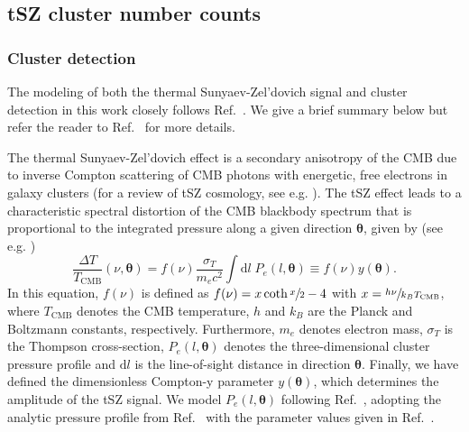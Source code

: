 \documentclass[%
 reprint,
nofootinbib,
 amsmath,amssymb,
 aps,
]{revtex4-1}
\begin{document}
\subsection{tSZ cluster number counts}

\subsubsection{Cluster detection}\label{subsubsec:obs.tSZ.detection}

The modeling of both the thermal Sunyaev-Zel'dovich signal and cluster detection in this work closely follows Ref.~\cite{Madhavacheril:2017}. We give a brief summary below but refer the reader to Ref.~\cite{Madhavacheril:2017} for more details.

The thermal Sunyaev-Zel'dovich effect is a secondary anisotropy of the CMB  due to inverse Compton scattering of CMB photons with energetic, free electrons in galaxy clusters (for a review of tSZ cosmology, see e.g. \cite{Carlstrom:2002}). The tSZ effect leads to a characteristic spectral distortion of the CMB blackbody spectrum that is proportional to the integrated pressure along a given direction $\boldsymbol{\theta}$, given by (see e.g. \cite{Carlstrom:2002, Planck:2016XXII})
\begin{equation}
\frac{\Delta T}{T_{\mathrm{CMB}}}(\nu, \boldsymbol{\theta}) = f(\nu) \frac{\sigma_{T}}{m_{e}c^{2}}\int \mathrm{d}l \; P_{e}(l, \boldsymbol{\theta}) \equiv f(\nu)y(\boldsymbol{\theta}).
\end{equation}
In this equation, $f(\nu)$ is defined as $f(\nu) = x \coth{\sfrac{x}{2}} - 4$ with $x=\sfrac{h \nu}{k_{B}T_{\mathrm{CMB}}}$, where $T_{\mathrm{CMB}}$ denotes the CMB temperature, $h$ and $k_{B}$ are the Planck and Boltzmann constants, respectively. Furthermore, $m_{e}$ denotes electron mass, $\sigma_{T}$ is the Thompson cross-section, $P_{e}(l, \boldsymbol{\theta})$ denotes the three-dimensional cluster pressure profile and $\mathrm{d}l$ is the line-of-sight distance in direction $\boldsymbol{\theta}$. Finally, we have defined the dimensionless Compton-y parameter $y(\boldsymbol{\theta})$, which determines the amplitude of the tSZ signal. We model $P_{e}(l, \boldsymbol{\theta})$ following Ref.~\cite{Madhavacheril:2017}, adopting the analytic pressure profile from Ref.~\cite{Arnaud:2010} with the parameter values given in Ref.~\cite{Madhavacheril:2017}.
\end{document}
